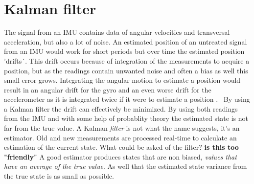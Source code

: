\documentclass[a4paper,11pt]{kth-mag}
\begin{document}
\section{Kalman filter}
The signal from an IMU contains data of angular velocities and transversal acceleration, but also a lot of noise. An estimated position of an untreated signal from an IMU would work for short periods but over time the estimated position 'drifts´. This drift occurs because of integration of the measurements to acquire a position, but as the readings contain unwanted noise and often a bias as well this small error grows. Integrating the angular motion to estimate a position would result in an angular drift for the gyro and an even worse drift for the accelerometer as it is integrated twice if it were to estimate a position \cite{MEMSdrift}. \
By using a Kalman filter the drift can effectively be minimized. By using both readings from the IMU and with some help of probablity theory the estimated state is not far from the true value.  A Kalman \textit{filter} is not what the name suggests, it's an estimator. Old and new measurements are processed real-time to calculate an estimation of the current state.
What could be asked of the filter? \textbf{is this too "friendly"}
A good estimator produces states that are non biased, \emph{values that have an average  of the true value}. As well that the estimated state variance from the true state is as small as possible.\cite{Simon2001}
\end{document}
